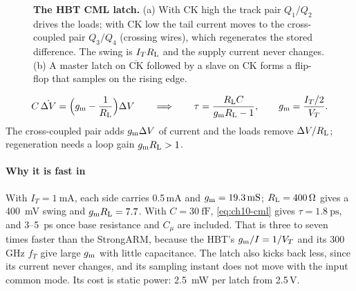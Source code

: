 \begin{figure}[tbp]
\caption{\textbf{The HBT CML latch.} (a) With CK high the track pair $Q_1/Q_2$ drives the loads; with CK low the tail current moves to the cross-coupled pair $Q_3/Q_4$ (crossing wires), which regenerates the stored difference. The swing is $I_TR_\mathrm{L}$ and the supply current never changes. (b) A master latch on $\overline{\mathrm{CK}}$ followed by a slave on CK forms a flip-flop that samples on the rising edge.}
\label{fig:ch10-cml}
\end{figure}

\begin{keyeq}
\begin{equation}
  C\,\dot{\Delta V}=\Big(g_\mathrm{m}-\frac{1}{R_\mathrm{L}}\Big)\Delta V\qquad\Longrightarrow\qquad \tau=\frac{R_\mathrm{L} C}{g_\mathrm{m}R_\mathrm{L}-1},\qquad g_\mathrm{m}=\frac{I_T/2}{V_T}.
  \label{eq:ch10-cml}
\end{equation}
The cross-coupled pair adds $g_\mathrm{m}\Delta V$ of current and the loads remove $\Delta V/R_\mathrm{L}$; regeneration needs a loop gain $g_\mathrm{m}R_\mathrm{L}>1$.
\end{keyeq}

\paragraph{Why it is fast in \sgx{}} With $I_T=\qty{1}{\milli\ampere}$, each side carries 0.5\,mA and $\gm=\qty{19.3}{\milli\siemens}$; $R_\mathrm{L}=\qty{400}{\ohm}$ gives a \qty{400}{\milli\volt} swing and $g_\mathrm{m}R_\mathrm{L}=7.7$. With $C=\qty{30}{\femto\farad}$, \cref{eq:ch10-cml} gives $\tau=\qty{1.8}{\pico\second}$, and 3--\qty{5}{\pico\second} once base resistance and $C_\mu$ are included. That is three to seven times faster than the StrongARM, because the HBT's $g_\mathrm{m}/I=1/V_T$ and its 300\,GHz $f_T$ give large $g_\mathrm{m}$ with little capacitance. The latch also kicks back less, since its current never changes, and its sampling instant does not move with the input common mode. Its cost is static power: \qty{2.5}{\milli\watt} per latch from 2.5\,V.

